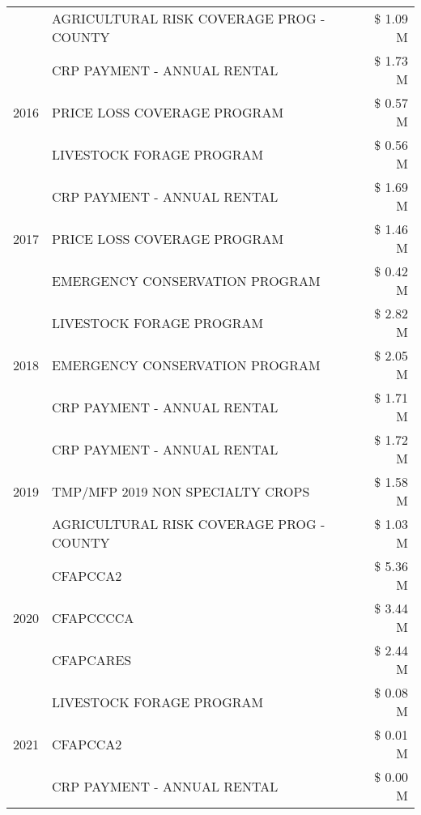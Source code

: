 \begin{tabular}{llr}
 & AGRICULTURAL RISK COVERAGE PROG - COUNTY & \$ 1.09 M \\
\cline{1-3}
\multirow[t]{3}{*}{2016} & CRP PAYMENT - ANNUAL RENTAL & \$ 1.73 M \\
 & PRICE LOSS COVERAGE PROGRAM & \$ 0.57 M \\
 & LIVESTOCK FORAGE PROGRAM & \$ 0.56 M \\
\cline{1-3}
\multirow[t]{3}{*}{2017} & CRP PAYMENT - ANNUAL RENTAL & \$ 1.69 M \\
 & PRICE LOSS COVERAGE PROGRAM & \$ 1.46 M \\
 & EMERGENCY CONSERVATION PROGRAM & \$ 0.42 M \\
\cline{1-3}
\multirow[t]{3}{*}{2018} & LIVESTOCK FORAGE PROGRAM & \$ 2.82 M \\
 & EMERGENCY CONSERVATION PROGRAM & \$ 2.05 M \\
 & CRP PAYMENT - ANNUAL RENTAL & \$ 1.71 M \\
\cline{1-3}
\multirow[t]{3}{*}{2019} & CRP PAYMENT - ANNUAL RENTAL & \$ 1.72 M \\
 & TMP/MFP 2019 NON SPECIALTY CROPS & \$ 1.58 M \\
 & AGRICULTURAL RISK COVERAGE PROG - COUNTY & \$ 1.03 M \\
\cline{1-3}
\multirow[t]{3}{*}{2020} & CFAPCCA2 & \$ 5.36 M \\
 & CFAPCCCCA & \$ 3.44 M \\
 & CFAPCARES & \$ 2.44 M \\
\cline{1-3}
\multirow[t]{3}{*}{2021} & LIVESTOCK FORAGE PROGRAM & \$ 0.08 M \\
 & CFAPCCA2 & \$ 0.01 M \\
 & CRP PAYMENT - ANNUAL RENTAL & \$ 0.00 M \\
\cline{1-3}
\bottomrule
\end{tabular}
